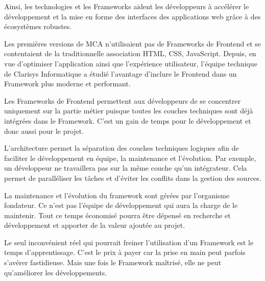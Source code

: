  Ainsi, les technologies et les Frameworks aident les développeurs à accélérer le développement 
 et la mise en forme des interfaces des applications web grâce à des écosystèmes robustes.

Les premières versions de MCA n’utilisaient pas de Frameworks de Frontend et se contentaient de 
la traditionnelle association HTML, CSS, JavaScript. Depuis, en vue d’optimiser l’application ainsi que
 l’expérience utilisateur, l’équipe technique de Clarisys Informatique a étudié l’avantage d’inclure le 
 Frontend dans un Framework plus moderne et performant.

Les Frameworks de Frontend permettent aux développeurs de se concentrer uniquement 
sur la partie métier puisque toutes les couches techniques sont déjà intégrées dans le Framework.
 C’est un gain de temps pour le développement et donc aussi pour le projet.

L’architecture permet la séparation des couches techniques logiques afin de faciliter le développement 
en équipe, la maintenance et l’évolution. Par exemple, un développeur ne travaillera pas sur la même 
couche qu’un intégrateur. Cela permet de paralléliser les tâches et d’éviter les conflits dans la 
gestion des sources.

La maintenance et l’évolution du framework sont gérées par l’organisme fondateur. Ce n’est pas l’équipe 
de développement qui aura la charge de le maintenir. Tout ce temps économisé pourra être dépensé en 
recherche et développement et apporter de la valeur ajoutée au projet.

Le seul inconvénient réel qui pourrait freiner l’utilisation d’un Framework est le temps d’apprentissage. 
C’est le prix à payer car la prise en main peut parfois s’avérer fastidieuse. Mais une fois le Framework 
maîtrisé, elle ne peut qu’améliorer les développements.
\pagebreak


